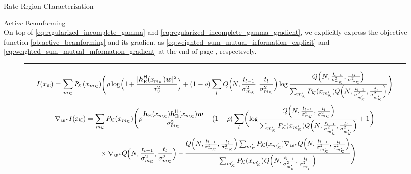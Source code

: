 \documentclass[journal]{IEEEtran}
\begin{document}
\begin{section}{Rate-Region Characterization}
\begin{subsection}{Active Beamforming}
\begin{equation}
			\label{eq:regularized_incomplete_gamma_gradient_component}
		\end{equation}
		On top of \eqref{eq:regularized_incomplete_gamma} and \eqref{eq:regularized_incomplete_gamma_gradient}, we explicitly express the objective function \eqref{ob:active_beamforming} and its gradient as \eqref{eq:weighted_sum_mutual_information_explicit} and \eqref{eq:weighted_sum_mutual_information_gradient} at the end of page \pageref{eq:weighted_sum_mutual_information_explicit}, respectively.
		\begin{figure*}[!b]
			\hrule
			\begin{equation}
				I(x_{\mathcal{K}})=\sum_{m_{\mathcal{K}}}P_{\mathcal{K}}(x_{m_{\mathcal{K}}})\Biggl(\rho\log\Bigl(1+\frac{\lvert\boldsymbol{h}_{\text{E}}^\mathsf{H}(x_{m_{\mathcal{K}}})\boldsymbol{w}\rvert^2}{\sigma_v^2}\Bigr)+(1-\rho)\sum_l Q\Bigl(N,\frac{t_{l-1}}{\sigma_{m_{\mathcal{K}}}^2},\frac{t_l}{\sigma_{m_{\mathcal{K}}}^2}\Bigr) \log \frac{Q\Bigl(N,\frac{t_{l-1}}{\sigma_{m_{\mathcal{K}}}^2},\frac{t_l}{\sigma_{m_{\mathcal{K}}}^2}\Bigr)}{\sum_{m_{\mathcal{K}}'} P_{\mathcal{K}}(x_{m_{\mathcal{K}}'}) Q\Bigl(N,\frac{t_{l-1}}{\sigma_{m_{\mathcal{K}}'}^2},\frac{t_l}{\sigma_{m_{\mathcal{K}}'}^2}\Bigr)}\Biggr)
				\label{eq:weighted_sum_mutual_information_explicit}
			\end{equation}
			\begin{align}
				\nabla_{\boldsymbol{w}^*} I(x_{\mathcal{K}})
				 & = \sum_{m_{\mathcal{K}}}P_{\mathcal{K}}(x_{m_{\mathcal{K}}})\Biggl(\rho\frac{\boldsymbol{h}_{\text{E}}(x_{m_{\mathcal{K}}})\boldsymbol{h}_{\text{E}}^\mathsf{H}(x_{m_{\mathcal{K}}})\boldsymbol{w}}{\sigma_{m_{\mathcal{K}}}^2}+(1-\rho)\sum_l\biggl(\log\frac{Q\Bigl(N,\frac{t_{l-1}}{\sigma_{m_{\mathcal{K}}}^2},\frac{t_l}{\sigma_{m_{\mathcal{K}}}^2}\Bigr)}{\sum_{m_{\mathcal{K}}'}P_{\mathcal{K}}(x_{m_{\mathcal{K}}'})Q\Bigl(N,\frac{t_{l-1}}{\sigma_{m_{\mathcal{K}}'}^2},\frac{t_l}{\sigma_{m_{\mathcal{K}}'}^2}\Bigr)}+1\biggr)\nonumber                                                             \\
				 & \qquad \times \nabla_{\boldsymbol{w}^*} Q\Bigl(N,\frac{t_{l-1}}{\sigma_{m_{\mathcal{K}}}^2},\frac{t_l}{\sigma_{m_{\mathcal{K}}}^2}\Bigr)-\frac{Q\Bigl(N,\frac{t_{l-1}}{\sigma_{m_{\mathcal{K}}}^2},\frac{t_l}{\sigma_{m_{\mathcal{K}}}^2}\Bigr)\sum_{m_{\mathcal{K}}'}P_{\mathcal{K}}(x_{m_{\mathcal{K}}'})\nabla_{\boldsymbol{w}^*}Q\Bigl(N,\frac{t_{l-1}}{\sigma_{m_{\mathcal{K}}'}^2},\frac{t_l}{\sigma_{m_{\mathcal{K}}'}^2}\Bigr)}{\sum_{m_{\mathcal{K}}'}P_{\mathcal{K}}(x_{m_{\mathcal{K}}'})Q\Bigl(N,\frac{t_{l-1}}{\sigma_{m_{\mathcal{K}}'}^2},\frac{t_l}{\sigma_{m_{\mathcal{K}}'}^2}\Bigr)}\Biggr)

\end{align}
\end{figure*}
\end{subsection}
\end{section}
\end{document}
